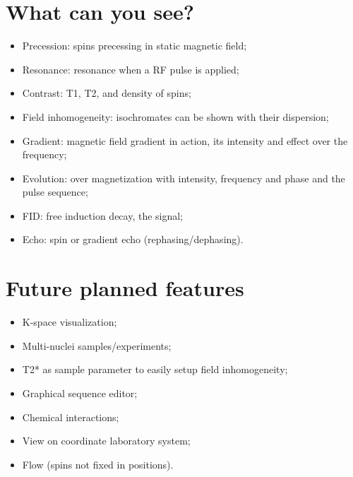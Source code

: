 \documentclass[a4paper,10pt,english]{sphinxmanual}
\begin{document}
\section{What can you see?}
\label{\detokenize{readme:what-can-you-see}}\begin{itemize}
\item {} 
Precession: spins precessing in static magnetic field;

\item {} 
Resonance: resonance when a RF pulse is applied;

\item {} 
Contrast: T1, T2, and density of spins;

\item {} 
Field inhomogeneity: isochromates can be shown with their dispersion;

\item {} 
Gradient: magnetic field gradient in action, its intensity and effect over the frequency;

\item {} 
Evolution: over magnetization with intensity, frequency and phase and the pulse sequence;

\item {} 
FID: free induction decay, the signal;

\item {} 
Echo: spin or gradient echo (rephasing/dephasing).

\end{itemize}


\section{Future planned features}
\label{\detokenize{readme:future-planned-features}}\begin{itemize}
\item {} 
K-space visualization;

\item {} 
Multi-nuclei samples/experiments;

\item {} 
T2* as sample parameter to easily setup field inhomogeneity;

\item {} 
Graphical sequence editor;

\item {} 
Chemical interactions;

\item {} 
View on coordinate laboratory system;

\item {} 
Flow (spins not fixed in positions).

\end{itemize}
\end{document}
